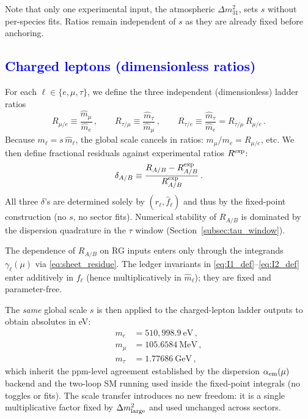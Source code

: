 \documentclass[%
amsmath,amssymb,
aps,
prb,
floatfix,showkeys
]{revtex4-2}
\newcommand{\modif}[1]{\textcolor{blue}{#1}}
\begin{document}
Note that only one experimental input, the atmospheric $\Delta m^2_{31}$, sets $s$ without per-species fits. Ratios remain independent of $s$ as they are already fixed before anchoring.

{\modif{\subsection{Charged leptons (dimensionless ratios)}
\label{subsec:leptons_ratios}}}

For each $\ell\in\{e,\mu,\tau\}$, we define the three independent (dimensionless) ladder ratios
\begin{equation}
  R_{\mu/e} \equiv \frac{\widehat m_\mu}{\widehat m_e}\,,\qquad
  R_{\tau/\mu} \equiv \frac{\widehat m_\tau}{\widehat m_\mu}\,,\qquad
  R_{\tau/e} \equiv \frac{\widehat m_\tau}{\widehat m_e}
  = R_{\tau/\mu}\,R_{\mu/e}\,.
  \label{eq:lepton_ratios}
\end{equation}
Because $m_\ell = s\,\widehat m_\ell$, the global scale cancels in ratios: $m_\mu/m_e = R_{\mu/e}$, etc. We then define fractional residuals against experimental ratios $R^{\rm exp}$:
\begin{equation}
  \delta_{A/B} \equiv \frac{R_{A/B} - R^{\rm exp}_{A/B}}{R^{\rm exp}_{A/B}}\,.
  \label{eq:ratio_residuals}
\end{equation}
All three $\delta$'s are determined solely by $(r_\ell,\widehat f_\ell)$ and thus by the fixed-point construction (no $s$, no sector fits). Numerical stability of $R_{A/B}$ is dominated by the dispersion quadrature in the $\tau$ window (Section~\ref{subsec:tau_window}).

The dependence of $R_{A/B}$ on RG inputs enters only through the integrands $\gamma_\ell(\mu)$ via \eqref{eq:sheet_residue}. The ledger invariants in \eqref{eq:I1_def}--\eqref{eq:I2_def} enter additively in $f_\ell$ (hence multiplicatively in $\widehat m_\ell$); they are fixed and parameter-free.

The \emph{same} global scale $s$ is then applied to the charged-lepton ladder outputs to obtain absolutes in eV:
\begin{align}
m_e &= 510{,}998.9~\text{eV}\,,\nonumber\\
m_\mu &= 105.6584~\text{MeV}\,,\\
m_\tau &= 1.77686~\text{GeV}\,,\nonumber
\end{align}
which inherit the ppm-level agreement established by the dispersion $\alpha_{\rm em}(\mu)$ backend and the two-loop SM running used inside the fixed-point integrals (no toggles or fits). The scale transfer introduces no new freedom: it is a single multiplicative factor fixed by $\Delta m^2_{\rm large}$ and used unchanged across sectors.
\end{document}
